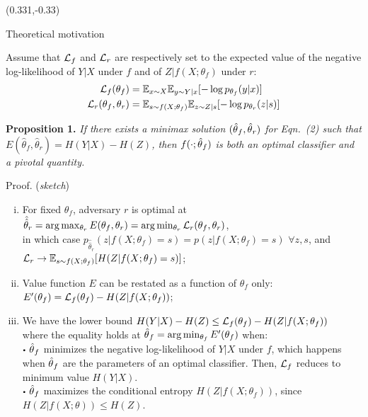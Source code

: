 \documentclass[final,unknownkeysallowed]{beamer}
\newcommand\sbullet[1][.5]{\mathbin{\vcenter{\hbox{\scalebox{#1}{$\bullet$}}}}}
\begin{document}
\begin{frame}{}

\begin{textblock}{0.32}(0.331,-0.33)

\begin{block}{Theoretical motivation \phantom{p}}

Assume that ${\cal L}_f$ and ${\cal L}_r$  are respectively set to the
expected value of the
negative log-likelihood of $Y|X$ under $f$ and of $Z|f(X;\theta_f)$ under
$r$:
\begin{align}
    {\cal L}_f(\theta_f) &= \mathbb{E}_{x \sim X}  \mathbb{E}_{y \sim Y|x} [ -\log p_{\theta_f} (y|x) ]  \\
    {\cal L}_r(\theta_f, \theta_r) &= \mathbb{E}_{s \sim f(X;\theta_f)}  \mathbb{E}_{z \sim Z|s} [-\log p_{\theta_r} (z|s)]
\end{align}

\begin{shaded}
\textbf{Proposition 1.}
\textit{If there exists a minimax solution $(\smash{\hat\theta}_f, \smash{\hat\theta}_r)$
for Eqn.~(2) such that
$E(\hat\theta_f, \hat\theta_r) = H({Y|X}) - H(Z)$, then
$f(\cdot;\smash{\hat\theta}_f)$ is both an optimal classifier and a pivotal
quantity.}
\end{shaded}

Proof. (\textit{sketch})\\
\begin{enumerate}[(i)]
\item For fixed $\theta_f$, adversary $r$ is optimal at $\hat{\hat\theta}_r = \arg \max_{\theta_r} E(\theta_f, \theta_r)  = \arg \min_{\theta_r} {\cal L}_r(\theta_f, \theta_r)$,\\
in which case $p_{\hat{\hat\theta}_r}(z|f(X;\theta_f)=s) = p(z|f(X;\theta_f)=s)$ $\forall z, s$, and\\
${\cal L}_r \to \mathbb{E}_{s \sim f(X;\theta_f)} [ H({Z|f(X;\theta_f)=s}) ]$;

\item Value function $E$ can be restated as a function of $\theta_f$ only: \\
$E'(\theta_f) = {\cal L}_f(\theta_f) -  H({Z|f(X;\theta_f)})$;

\item We have the lower bound $H({Y|X}) - H(Z) \leq {\cal L}_f(\theta_f) - H({Z|f(X;\theta_f)})$ \\
where the equality holds at $\smash{\hat\theta}_f = \arg \min_{\theta_f} E'(\theta_f)$ when: \\
 $\sbullet$ $\smash{\hat\theta}_f$ minimizes the negative log-likelihood of $Y|X$ under $f$,
    which happens when $\smash{\hat\theta}_f$ are the parameters
    of an optimal classifier. Then, ${\cal L}_f$ reduces to
    minimum value $H({Y|X})$. \\
  $\sbullet$ $\smash{\hat\theta}_f$ maximizes the conditional entropy
    $H({Z|f(X;\theta_f)})$, since $H(Z|f(X;\theta)) \leq H(Z)$.
\end{enumerate}



\end{block}
\end{textblock}
\end{frame}
\end{document}
